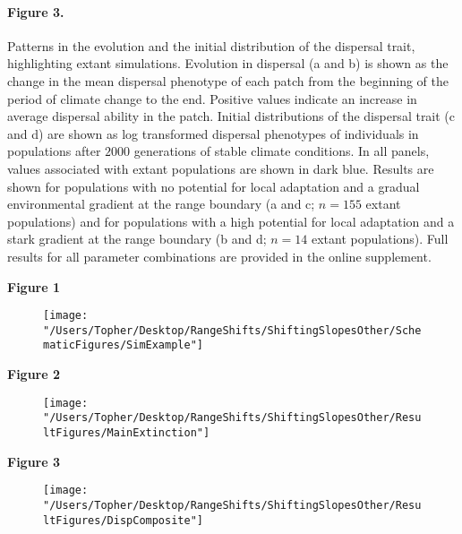\documentclass[12pt, oneside]{article}
\begin{document}
\paragraph{Figure 3.} Patterns in the evolution and the initial distribution of the dispersal trait, highlighting extant simulations. Evolution in dispersal (a and b) is shown as the change in the mean dispersal phenotype of each patch from the beginning of the period of climate change to the end. Positive values indicate an increase in average dispersal ability in the patch. Initial distributions of the dispersal trait (c and d) are shown as log transformed dispersal phenotypes of individuals in populations after $2000$ generations of stable climate conditions. In all panels, values associated with extant populations are shown in dark blue. Results are shown for populations with no potential for local adaptation and a gradual environmental gradient at the range boundary (a and c; $n = 155$ extant populations) and for populations with a high potential for local adaptation and a stark gradient at the range boundary (b and d; $n = 14$ extant populations). Full results for all parameter combinations are provided in the online supplement.

\newpage

\large{\textbf{Figure 1}}
\begin{figure}
\centering
\texttt{[image: "/Users/Topher/Desktop/RangeShifts/ShiftingSlopesOther/SchematicFigures/SimExample"]}
\vspace{-5mm}
\label{fig:SimExample}
\end{figure}

\clearpage

\large{\textbf{Figure 2}}
\begin{figure}
\centering
\texttt{[image: "/Users/Topher/Desktop/RangeShifts/ShiftingSlopesOther/ResultFigures/MainExtinction"]}
\vspace{-5mm}
\label{fig:ExtProb}
\end{figure}

\clearpage

\large{\textbf{Figure 3}}
\begin{figure}
\centering
\texttt{[image: "/Users/Topher/Desktop/RangeShifts/ShiftingSlopesOther/ResultFigures/DispComposite"]}
\vspace{-5mm}
\label{fig:Disp}
\end{figure}
\end{document}
